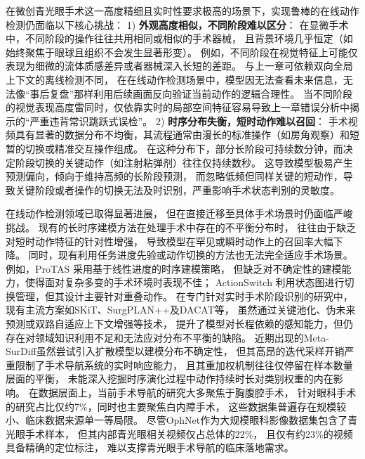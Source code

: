 在微创青光眼手术这一高度精细且实时性要求极高的场景下，实现鲁棒的在线动作检测仍面临以下核心挑战：
1) \textbf{外观高度相似，不同阶段难以区分}：
在显微手术中，不同阶段的操作往往共用相同或相似的手术器械，
且背景环境几乎恒定（如始终聚焦于眼球且组织不会发生显著形变）。
例如，不同阶段在视觉特征上可能仅表现为细微的流体质感差异或者器械深入长短的差距。
与上一章可依赖双向全局上下文的离线检测不同，
在在线动作检测场景中，模型因无法查看未来信息，无法像“事后复盘”那样利用后续画面反向验证当前动作的逻辑合理性。
当不同阶段的视觉表现高度雷同时，仅依靠实时的局部空间特征容易导致上一章错误分析中揭示的“严重违背常识跳跃式误检”。
2) \textbf{时序分布失衡，短时动作难以召回}：
手术视频具有显著的数据分布不均衡，其流程通常由漫长的标准操作（如房角观察）和短暂的切换或精准交互操作组成。
在这种分布下，部分长阶段可持续数分钟，而决定阶段切换的关键动作（如注射粘弹剂）往往仅持续数秒。
这导致模型极易产生预测偏向，倾向于维持高频的长阶段预测，
而忽略低频但同样关键的短动作，导致关键阶段或者操作的切换无法及时识别，严重影响手术状态判别的灵敏度。

在线动作检测领域已取得显著进展，
但在直接迁移至具体手术场景时仍面临严峻挑战。
现有的长时序建模方法在处理手术中存在的不平衡分布时，
往往由于缺乏对短时动作特征的针对性增强，
导致模型在罕见或瞬时动作上的召回率大幅下降。
同时，现有利用任务进度先验或动作切换的方法也无法完全适应手术场景。
例如，ProTAS\cite{shen2024progress} 采用基于线性进度的时序建模策略，
但缺乏对不确定性的建模能力，使得面对复杂多变的手术环境时表现不佳；
ActionSwitch\cite{kang2024actionswitch} 利用状态图进行切换管理，但其设计主要针对重叠动作。
在专门针对实时手术阶段识别的研究中，
现有主流方案如SKiT\cite{skit2023}、SurgPLAN++\cite{chen2025surgplan++}及DACAT\cite{yang2025dacat}等，
虽然通过关键池化、伪未来预测或双路自适应上下文增强等技术，
提升了模型对长程依赖的感知能力，但仍存在对领域知识利用不足和无法应对分布不平衡的缺陷。
近期出现的Meta-SurDiff\cite{li2025meta}虽然尝试引入扩散模型以建模分布不确定性，
但其高昂的迭代采样开销严重限制了手术导航系统的实时响应能力，
且其重加权机制往往仅停留在样本数量层面的平衡，
未能深入挖掘时序演化过程中动作持续时长对类别权重的内在影响。
在数据层面上，当前手术导航的研究大多聚焦于胸腹腔手术，
针对眼科手术的研究占比仅约7\%，同时也主要聚焦白内障手术，
这些数据集普遍存在规模较小、临床数据来源单一等局限\cite{liu2025deep, hu2024ophnet}。
尽管OphNet\cite{hu2024ophnet}作为大规模眼科影像数据集包含了青光眼手术样本，
但其内部青光眼相关视频仅占总体的22\%，
且仅有约23\%的视频具备精确的定位标注，
难以支撑青光眼手术导航的临床落地需求。

